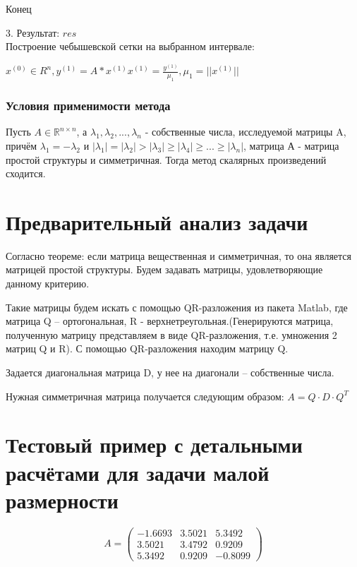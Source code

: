 \documentclass{article}
\begin{document}
	
	Конец
	
	3. Результат: $res$
	~\\
	
	Построение чебышевской сетки на выбранном интервале:
	
	$x^{(0)} \in R^n,y^{(1)} = A*x^{(1)} x^{(1)} = \frac{y^{(1)}}{\mu_1}, \mu_1 = ||x^{(1)}||$
	
	
	\subsubsection{Условия применимости метода}
	Пусть $A \in \mathbb{R}^{n \times n}$, а $\lambda_1, \lambda_2,...,\lambda_n$ - собственные числа, исследуемой матрицы A, причём $\lambda_1 = -\lambda_2$ и $|\lambda_1| = |\lambda_2| > |\lambda_3| \geq |\lambda_4| \geq ... \geq |\lambda_n|$, матрица А - матрица простой структуры и симметричная. Тогда метод скалярных произведений сходится.
	
	
	
	\section{Предварительный анализ задачи}
	Согласно теореме: если матрица вещественная и симметричная, то она является матрицей простой структуры. Будем задавать матрицы, удовлетворяющие данному критерию.
	
	Такие матрицы будем искать с помощью QR-разложения из пакета Matlab, где матрица Q – ортогональная, R - верхнетреугольная.(Генерируются матрица, полученную матрицу представляем в виде QR-разложения, т.е. умножения 2 матриц Q и R). С помощью QR-разложения находим матрицу Q.
	
	Задается диагональная матрица D, у нее на диагонали – собственные числа. 
	
	Нужная симметричная матрица получается следующим образом:
	$A = Q \cdot D \cdot Q^T$
	
	\section{Тестовый пример с детальными расчётами для задачи малой размерности}
	
	
	
	\[A =							
	\left(
	\begin{array}{ccc}
		-1.6693 & 3.5021 & 5.3492\\
		3.5021 & 3.4792 & 0.9209 \\
		5.3492 & 0.9209 & -0.8099
	\end{array}
	\right)
	\] 
	
\end{document}
